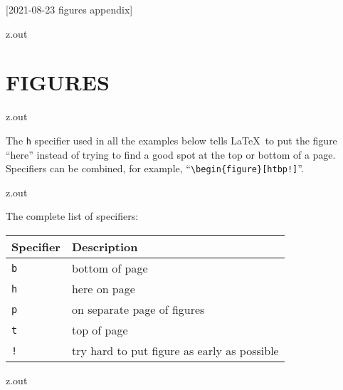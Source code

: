 [2021-08-23 figures appendix]

\begin{VerbatimOut}{z.out}
\chapter{FIGURES}

\end{VerbatimOut}

\MyIO


\begin{VerbatimOut}{z.out}

The
\verb+h+
specifier used in all the examples below
tells \LaTeX\ to put the figure
``here''
instead of trying
to find a good spot
at the top or bottom of a page.
Specifiers can be combined,
for example,
``\verb+\begin{figure}[htbp!]+''.
\end{VerbatimOut}

\MyIO


\begin{VerbatimOut}{z.out}

The complete list of specifiers:
\vspace*{6pt}
\begin{center}
  \begin{tabular}{@{}ll@{}}
    \toprule
    \bf Specifier& \bf Description\\
    \midrule
    \noalign{\vspace*{2pt}}
    \tt b& bottom of page\\
    \tt h& here on page\\
    \tt p& on separate page of figures\\
    \tt t& top of page\\
    \tt !& try hard to put figure as early as possible\\
    \bottomrule
  \end{tabular}
\end{center}
\end{VerbatimOut}

\MyIO



\begin{VerbatimOut}{z.out}

\end{VerbatimOut}

